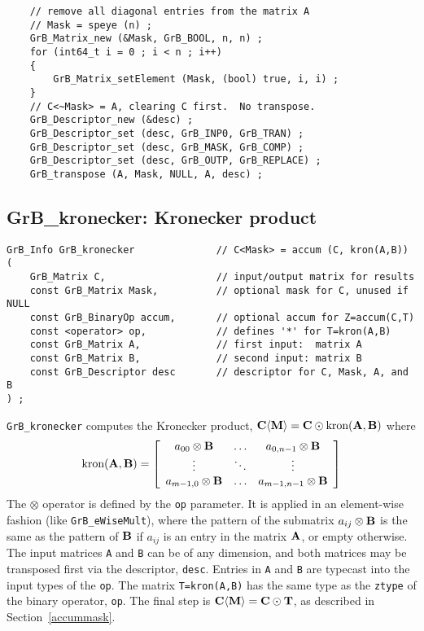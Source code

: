\documentclass[12pt]{article}
\begin{document}
    {\footnotesize
    \begin{verbatim}
    // remove all diagonal entries from the matrix A
    // Mask = speye (n) ;
    GrB_Matrix_new (&Mask, GrB_BOOL, n, n) ;
    for (int64_t i = 0 ; i < n ; i++)
    {
        GrB_Matrix_setElement (Mask, (bool) true, i, i) ;
    }
    // C<~Mask> = A, clearing C first.  No transpose.
    GrB_Descriptor_new (&desc) ;
    GrB_Descriptor_set (desc, GrB_INP0, GrB_TRAN) ;
    GrB_Descriptor_set (desc, GrB_MASK, GrB_COMP) ;
    GrB_Descriptor_set (desc, GrB_OUTP, GrB_REPLACE) ;
    GrB_transpose (A, Mask, NULL, A, desc) ; \end{verbatim}}

\newpage
\subsection{{\sf GrB\_kronecker:} Kronecker product} %
\label{kron}

\begin{mdframed}[userdefinedwidth=6in]
{\footnotesize
\begin{verbatim}
GrB_Info GrB_kronecker              // C<Mask> = accum (C, kron(A,B))
(
    GrB_Matrix C,                   // input/output matrix for results
    const GrB_Matrix Mask,          // optional mask for C, unused if NULL
    const GrB_BinaryOp accum,       // optional accum for Z=accum(C,T)
    const <operator> op,            // defines '*' for T=kron(A,B)
    const GrB_Matrix A,             // first input:  matrix A
    const GrB_Matrix B,             // second input: matrix B
    const GrB_Descriptor desc       // descriptor for C, Mask, A, and B
) ;
\end{verbatim} } \end{mdframed}

\verb'GrB_kronecker' computes the Kronecker product,
${\bf C \langle M \rangle = C \odot \mbox{kron}(A,B)}$ where
\[
\mbox{kron}{\bf (A,B)} =
\left[
    \begin{array}{ccc}
    a_{00} \otimes {\bf B} & \ldots & a_{0,n-1} \otimes {\bf B} \\
    \vdots & \ddots & \vdots \\
    a_{m-1,0} \otimes {\bf B} & \ldots & a_{m-1,n-1} \otimes {\bf B} \\
    \end{array}
\right]
\]
The $\otimes$ operator is defined by the \verb'op' parameter.  It is applied in
an element-wise fashion (like \verb'GrB_eWiseMult'), where the pattern of the
submatrix $a_{ij} \otimes {\bf B}$ is the same as the pattern of ${\bf B}$ if
$a_{ij}$ is an entry in the matrix ${\bf A}$, or empty otherwise.  The input
matrices \verb'A' and \verb'B' can be of any dimension, and both matrices may
be transposed first via the descriptor, \verb'desc'.  Entries in \verb'A' and
\verb'B' are typecast into the input types of the \verb'op'.  The matrix
\verb'T=kron(A,B)' has the same type as the \verb'ztype' of the binary
operator, \verb'op'.  The final step is ${\bf C \langle M \rangle  = C \odot
T}$, as described in Section~\ref{accummask}.
\end{document}

